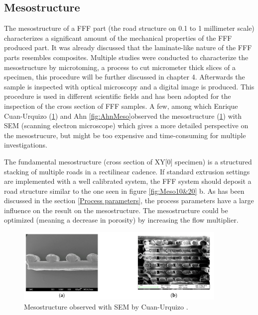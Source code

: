 \subsection{Mesostructure}
\label{mesostructure}
The mesostructure of a FFF part (the road structure on 0.1 to 1 millimeter scale) characterizes a significant amount of the mechanical properties of the FFF produced part. It was already discussed that the laminate-like nature of the FFF parts resembles composites. Multiple studies \cite{Somireddy2017MechanicalMesostructure} \cite{Somireddy2018DevelopmentFDM} \cite{Rodriguez2001MechanicalInvestigation} were conducted to characterize the mesostructure by microtoming, a process to cut micrometer thick slices of a specimen, this procedure will be further discussed in chapter 4. Afterwards the sample is inspected with optical microscopy and a digital image is produced. This procedure is used in different scientific fields and has been adopted for the inspection of the cross section of FFF samples. A few, among which Enrique Cuan-Urquizo \cite{Cuan-Urquizo2019CharacterizationApproaches} (\ref{fig:SEMmesostructure}) and Ahn \cite{Ahn2002AnisotropicABS} \ref{fig:AhnMeso}observed the mesostructure (\ref{fig:SEMmesostructure}) with SEM (scanning electron microscope) which gives a more detailed perspective on the mesostrucure, but might be too expensive and time-consuming for multiple investigations.



The fundamental mesostructure (cross section of XY[0] specimen) is a structured stacking of multiple roads in a rectilinear cadence. If standard extrusion settings are implemented with a well calibrated system, the FFF system should deposit a road structure similar to the one seen in figure \ref{fig:Meso10&20} b. As has been discussed in the section \ref{Process parameters}, the process parameters have a large influence on the result on the mesostructure.  The mesostructure could be optimized (meaning a decrease in porosity) by increasing the flow multiplier.

\begin{figure}[htb]
    \centering
    \includegraphics[width=0.9\textwidth]{chapter_2/figures/SEMmesostructure.PNG}
    \caption{Mesostructure observed with SEM by Cuan-Urquizo \cite{Cuan-Urquizo2019CharacterizationApproaches}.}
    \label{fig:SEMmesostructure}
\end{figure}

